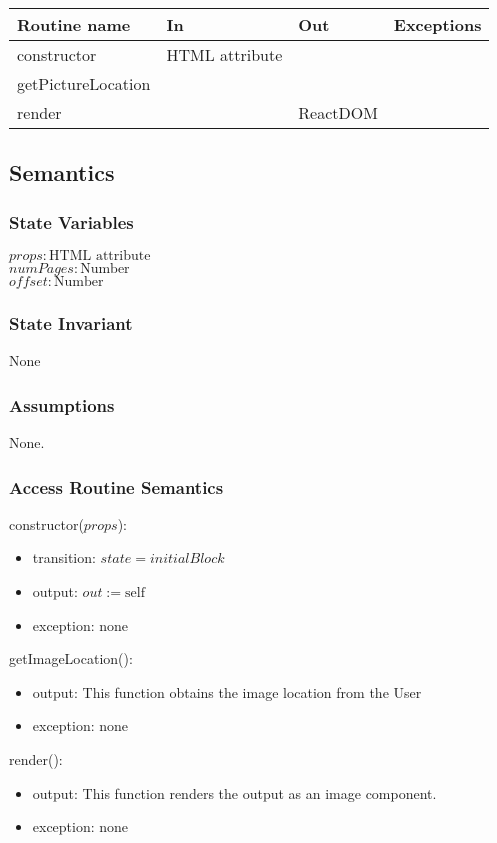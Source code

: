 \documentclass[12pt, titlepage]{article}
\begin{document}
\begin{tabular}{| l | l | l | l |}
  \hline
  \textbf{Routine name} & \textbf{In} & \textbf{Out} & \textbf{Exceptions}\\
  \hline
  constructor & HTML attribute & ~ & ~\\
  \hline
  getPictureLocation & ~ & ~ & ~\\
  \hline
  render & ~ & ReactDOM & ~\\
  \hline
\end{tabular}

\subsection{Semantics}

\subsubsection{State Variables}

$\mathit{props}: \text{HTML attribute}$\\
$\mathit{numPages}: \text{Number}$\\
$\mathit{offset}: \text{Number}$

\subsubsection{State Invariant}

None

\subsubsection{Assumptions}

None.

\subsubsection{Access Routine Semantics}

\noindent constructor($props$):
\begin{itemize}
\item transition: $\mathit{state} = initialBlock$
\item output: $out := \mbox{self}$
\item exception: none
\end{itemize}

\noindent getImageLocation():
\begin{itemize}
\item output: This function obtains the image location from the User
\item exception: none
\end{itemize}

\noindent render():
\begin{itemize}
\item output: This function renders the output as an image component.
\item exception: none
\end{itemize}
\end{document}
